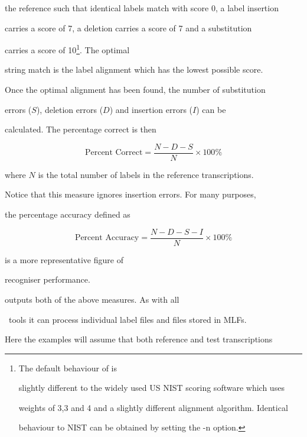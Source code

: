 the reference such that identical labels match with score 0, a label insertion


carries a score of 7, a deletion carries a score of 7 and a substitution


carries a score of 10\footnote{The default behaviour of  is


slightly different to the widely used US NIST scoring software which uses


weights of 3,3 and 4 and a slightly different alignment algorithm. Identical


behaviour to NIST can be obtained by setting the -n option.}. The optimal


string match is the label alignment which has the lowest possible score.





Once the optimal alignment has been found, the number of substitution


errors ($S$), deletion errors ($D$) and insertion errors ($I$) can be


calculated.  The percentage correct is then


\begin{equation}


    \mbox{Percent Correct} = \frac{N-D-S}{N} \times 100\%


\end{equation}


where $N$ is the total number of labels in the reference transcriptions.


Notice that this measure ignores insertion errors.  For many purposes,


the percentage accuracy defined as


\begin{equation}


    \mbox{Percent Accuracy} = \frac{N-D-S-I}{N} \times 100\%


\end{equation}


is a more representative figure of 


recogniser performance.





 outputs both of the above measures. As with all 


\HTK\ tools it can process individual label files and files stored in MLFs.


Here the examples will assume that both reference and test transcriptions


